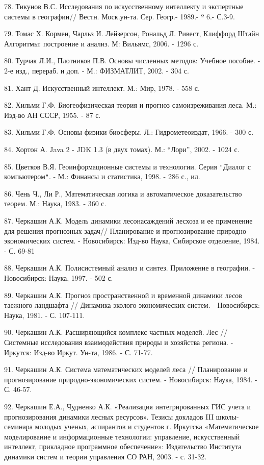 \documentclass{article}
\begin{document}
78. Тикунов В.С. Исследования по искусственному 
интеллекту и экспертные системы в географии// 
Вестн. Моск.ун-та. Сер. Геогр.- 1989.- º 6.- С.3-9.

79. Томас Х. Кормен, Чарльз И. Лейзерсон, Рональд 
Л. Ривест, Клиффорд Штайн Алгоритмы: построение 
и анализ. М: Вильямс, 2006. - 1296 с.

80. Турчак Л.И., Плотников П.В. Основы численных 
методов: Учебное пособие. - 2-е изд., перераб. 
и доп. - М.: ФИЗМАТЛИТ, 2002. - 304 с. 

81. Хант Д. Искусственный интеллект. М.: Мир, 1978. 
- 558 с.

82. Хильми Г.Ф. Биогеофизическая теория и прогноз 
самоизреживания леса. М.: Изд-во АН СССР, 1955. 
- 87 с.

83. Хильми Г.Ф. Основы физики биосферы. Л.: Гидрометеоиздат, 
1966. - 300 с.\label{OLEHLINK30}\label{OLEHLINK31}

84. Хортон А. Java 2 - JDK 1.3 (в двух томах). М.: ``Лори'', 
2002. - 1024 с.

85. Цветков В.Я. Геоинформационные системы и 
технологии. Серия \texttt{"}Диалог с компьютером\texttt{"}. 
- М.: Финансы и статистика, 1998. - 286 с., ил.

86. Чень Ч., Ли Р., Математическая логика и автоматическое 
доказательство теорем. М.: Наука, 1983. - 360 с.

87. Черкашин А.К. Модель динамики лесонасаждений 
лесхоза и ее применение для решения прогнозных 
задач// Планирование и прогнозирование природно-экономических 
систем. - Новосибирск: Изд-во Наука, Сибирское 
отделение, 1984. - С. 69-81

88. Черкашин А.К. Полисистемный анализ и синтез. 
Приложение в географии. - Новосибирск: Наука, 
1997. - 502 с.

89. Черкашин А.К. Прогноз пространственной и 
временной динамики лесов таежного ландшафта 
// Динамика эколого-экономических систем. - Новосибирск: 
Наука, 1981. - С. 107-111.

90. Черкашин А.К. Расширяющийся комплекс частных 
моделей. Лес // Системные исследования взаимодействия 
природы и хозяйства региона. - Иркутск: Изд-во 
Иркут. Ун-та, 1986. - С. 71-77.

91. Черкашин А.К. Система математических моделей 
леса // Планирование и прогнозирование природно-экономических 
систем. - Новосибирск: Наука, 1984. - С. 46-57.

92. Черкашин Е.А., Чудненко А.К. «Реализация интегрированных 
ГИС учета и прогнозирования динамики лесных 
ресурсов». Тезисы докладов III школы-семинара 
молодых ученых, аспирантов и студентов г. Иркутска 
«Математическое моделирование и информационные 
технологии: управление, искусственный интеллект, 
прикладное программное обеспечение»: Издательство 
Института динамики систем и теории управления 
СО РАН, 2003. - с. 31-32.
\end{document}
